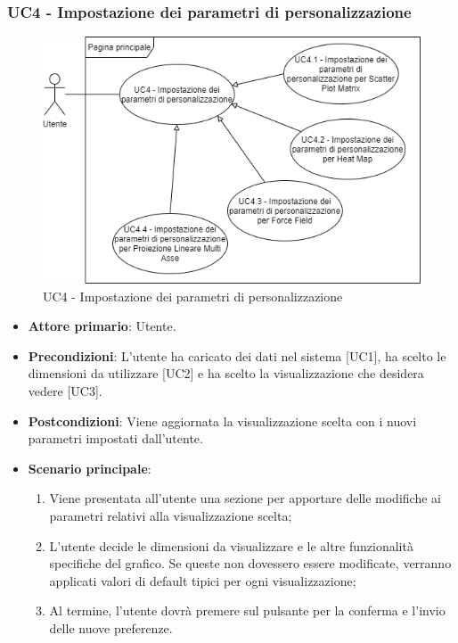 \subsubsection{UC4 - Impostazione dei parametri di personalizzazione}
\begin{figure}[h]
\includegraphics[width=\linewidth]{section/Images/UC4.png}
\centering
\caption{UC4 - Impostazione dei parametri di personalizzazione}
\end{figure}
\begin{itemize}
	\item \textbf{Attore primario}: Utente.
	\item \textbf{Precondizioni}: L'utente ha caricato dei dati nel sistema [UC1], ha scelto le dimensioni da utilizzare [UC2] e ha scelto la visualizzazione che desidera vedere [UC3].
	\item \textbf{Postcondizioni}: Viene aggiornata la visualizzazione scelta con i nuovi parametri impostati dall'utente.
	\item \textbf{Scenario principale}:
		\begin{enumerate}
			\item Viene presentata all'utente una sezione per apportare delle modifiche ai parametri relativi alla visualizzazione scelta;
			\item L'utente decide le dimensioni da visualizzare e le altre funzionalità specifiche del grafico. Se queste non dovessero essere modificate, verranno applicati valori di default tipici per ogni visualizzazione;
			\item Al termine, l'utente dovrà premere sul pulsante per la conferma e l'invio delle nuove preferenze.
		\end{enumerate}
\end{itemize}
